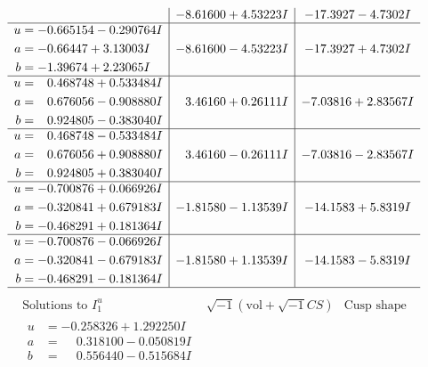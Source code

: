 \documentclass[1p]{elsarticle_modified}
\theoremstyle{definition}
\newcommand{\I}{\sqrt{-1}}
\begin{document}
$$\begin{array}{c|c|c}
 & -8.61600 + 4.53223 I & -17.3927 - 4.7302 I \\ \hline\begin{aligned}
u &= -0.665154 - 0.290764 I \\
a &= -0.66447 + 3.13003 I \\
b &= -1.39674 + 2.23065 I\end{aligned}
 & -8.61600 - 4.53223 I & -17.3927 + 4.7302 I \\ \hline\begin{aligned}
u &= \phantom{-}0.468748 + 0.533484 I \\
a &= \phantom{-}0.676056 - 0.908880 I \\
b &= \phantom{-}0.924805 - 0.383040 I\end{aligned}
 & \phantom{-}3.46160 + 0.26111 I & -7.03816 + 2.83567 I \\ \hline\begin{aligned}
u &= \phantom{-}0.468748 - 0.533484 I \\
a &= \phantom{-}0.676056 + 0.908880 I \\
b &= \phantom{-}0.924805 + 0.383040 I\end{aligned}
 & \phantom{-}3.46160 - 0.26111 I & -7.03816 - 2.83567 I \\ \hline\begin{aligned}
u &= -0.700876 + 0.066926 I \\
a &= -0.320841 + 0.679183 I \\
b &= -0.468291 + 0.181364 I\end{aligned}
 & -1.81580 - 1.13539 I & -14.1583 + 5.8319 I \\ \hline\begin{aligned}
u &= -0.700876 - 0.066926 I \\
a &= -0.320841 - 0.679183 I \\
b &= -0.468291 - 0.181364 I\end{aligned}
 & -1.81580 + 1.13539 I & -14.1583 - 5.8319 I\\
 \hline 
 \end{array}$$\newpage$$\begin{array}{c|c|c}  
\text{Solutions to }I^u_{1}& \I (\text{vol} + \sqrt{-1}CS) & \text{Cusp shape}\\
 \hline 
\begin{aligned}
u &= -0.258326 + 1.292250 I \\
a &= \phantom{-}0.318100 - 0.050819 I \\
b &= \phantom{-}0.556440 - 0.515684 I\end{aligned}

\end{array}$$
\end{document}
